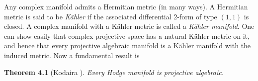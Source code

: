 {Any complex manifold admits a Hermitian metric (in many ways). A Hermitian metric is said to be \emph{K\"ahler} if the associated differential $2$-form of type $(1,1)$ is closed. A complex manifold with a K\"ahler metric is called a \emph{K\"ahler manifold}. One can show easily that complex projective space has a natural K\"ahler metric on it, and hence that every projective algebraic manifold is a K\"ahler manifold with the induced metric.  Now a fundamental result is

\medskip
\noindent\hypertarget{result-B-4.1}{}\textbf{Theorem 4.1} (Kodaira ). \emph{Every Hodge manifold is projective algebraic.}
}
